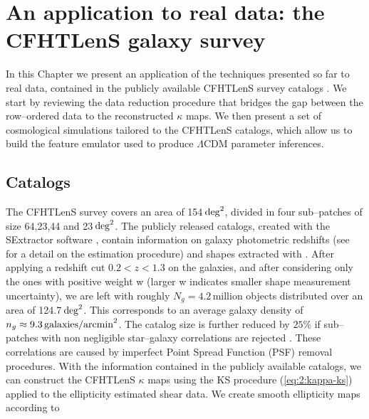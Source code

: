 
\chapter{An application to real data: the CFHTLenS galaxy survey}
\lhead[\fancyplain{}{\thepage}]{\fancyplain{}{\rightmark}}
 \thispagestyle{plain}
\setlength{\parindent}{10mm}

\label{chp:6}

In this Chapter we present an application of the techniques presented so far to real data, contained in the publicly available CFHTLenS survey catalogs \citep{cfht1,cfht2,CFHTKilbinger}. We start by reviewing the data reduction procedure that bridges the gap between the row--ordered data to the reconstructed $\kappa$ maps. We then present a set of cosmological simulations tailored to the CFHTLenS catalogs, which allow us to build the feature emulator used to produce $\Lambda$CDM parameter inferences.   

\section{Catalogs}
The CFHTLenS survey covers an area of 154\,${\rm deg}^2$, divided in four sub--patches of size 64,23,44 and 23\,${\rm deg}^2$. The publicly released catalogs, created with the SExtractor software \citep{SExtractor}, contain information on  galaxy photometric redshifts (see \citep{cfhtPhoto} for a detail on the estimation procedure) and shapes extracted with  \citep{cfht1,cfht2}. After applying a redshift cut $0.2<z<1.3$ on the galaxies, and after considering only the ones with positive weight w (larger w indicates smaller shape measurement uncertainty), we are left with roughly $N_g=4.2$\,million objects distributed over an area of 124.7\,${\rm deg}^2$. This corresponds to an average galaxy density of $n_g\approx 9.3\,{\rm galaxies/arcmin}^2$. The catalog size is further reduced by $25\%$ if sub--patches with non negligible star--galaxy correlations are rejected \citep{CFHTFu}. These correlations are caused by imperfect Point Spread Function (PSF) removal procedures. With the information contained in the publicly available catalogs, we can construct the CFHTLenS $\kappa$ maps using the KS procedure (\ref{eq:2:kappa-ks}) applied to the ellipticity estimated shear data. We create smooth ellipticity maps according to \citep{PetriCFHTMink,PetriCFHTPeaks}

